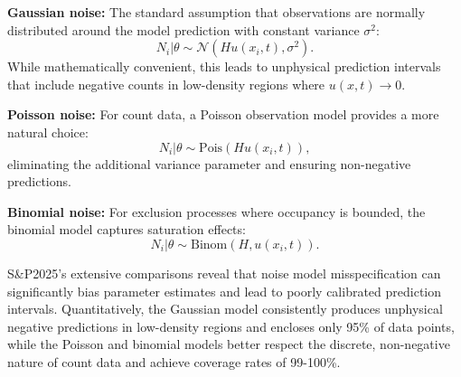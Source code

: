 \documentclass{article}
\begin{document}
\textbf{Gaussian noise:} The standard assumption that observations are normally distributed around the model prediction with constant variance $\sigma^2$:
\begin{equation}
	N_i | \theta \sim \mathcal{N}(Hu(x_i, t), \sigma^2).
\end{equation}
While mathematically convenient, this leads to unphysical prediction intervals that include negative counts in low-density regions where $u(x,t) \to 0$.

\textbf{Poisson noise:} For count data, a Poisson observation model provides a more natural choice:
\begin{equation}
	N_i | \theta \sim \text{Pois}(Hu(x_i, t)),
\end{equation}
eliminating the additional variance parameter and ensuring non-negative predictions.

\textbf{Binomial noise:} For exclusion processes where occupancy is bounded, the binomial model captures saturation effects:
\begin{equation}
	N_i | \theta \sim \text{Binom}(H, u(x_i, t)).
\end{equation}

S\&P2025's extensive comparisons reveal that noise model misspecification can significantly bias parameter estimates and lead to poorly calibrated prediction intervals. Quantitatively, the Gaussian model consistently produces unphysical negative predictions in low-density regions and encloses only 95\% of data points, while the Poisson and binomial models better respect the discrete, non-negative nature of count data and achieve coverage rates of 99-100\%.
\end{document}
